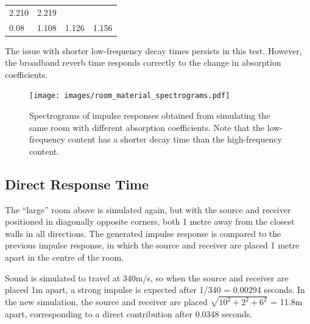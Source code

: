 \documentclass[]{scrreprt}
\begin{document}
\begin{longtable}[c]{@{}llll@{}}
\begin{minipage}[t]{0.22\columnwidth}
2.210
\strut\end{minipage} &
\begin{minipage}[t]{0.27\columnwidth}\raggedright\strut
2.219
\strut\end{minipage}\tabularnewline
\begin{minipage}[t]{0.22\columnwidth}\raggedright\strut
0.08
\strut\end{minipage} &
\begin{minipage}[t]{0.18\columnwidth}\raggedright\strut
1.108
\strut\end{minipage} &
\begin{minipage}[t]{0.22\columnwidth}\raggedright\strut
1.126
\strut\end{minipage} &
\begin{minipage}[t]{0.27\columnwidth}\raggedright\strut
1.156
\strut\end{minipage}\tabularnewline
\bottomrule
\end{longtable}

The issue with shorter low-frequency decay times persists in this test.
However, the broadband reverb time responds correctly to the change in
absorption coefficients.

\begin{figure}[htbp]
\centering
\texttt{[image: images/room\_material\_spectrograms.pdf]}
\caption{Spectrograms of impulse responses obtained from simulating the
same room with different absorption coefficients. Note that the
low-frequency content has a shorter decay time than the high-frequency
content.\label{fig:room_material_spectrograms}}
\end{figure}

\subsection{Direct Response Time}\label{direct-response-time}

The ``large'' room above is simulated again, but with the source and
receiver positioned in diagonally opposite corners, both 1 metre away
from the closest walls in all directions. The generated impulse response
is compared to the previous impulse response, in which the source and
receiver are placed 1 metre apart in the centre of the room.

Sound is simulated to travel at 340m/s, so when the source and receiver
are placed 1m apart, a strong impulse is expected after 1/340 = 0.00294
seconds. In the new simulation, the source and receiver are placed
\(\sqrt{10^2 + 2^2 + 6^2}\) = 11.8m apart, corresponding to a direct
contribution after 0.0348 seconds.
\end{document}

